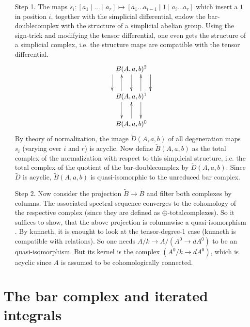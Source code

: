 \begin{itemize}
\item[Step 1.] The maps $s_i : [a_1 \mid \ldots \mid a_r] \mapsto [ a_1 \ldots a_{i-1} \mid 1 \mid a_i \ldots a_r]$ which insert a $1$ in position $i$, together with the simplicial differential, endow the bar-doublecomplex with the structure of a simplicial abelian group. Using the sign-trick and modifying the tensor differential, one even gets the structure of a simplicial complex, i.e. the structure maps are compatible with the tensor differential. 
\[
\xymatrix{
B(A, a, b)^2 \ar@<1cm>[d] \ar@<0cm>[d] \ar@<-1cm>[d] \\
B(A, a, b)^1 \ar@<0.5cm>[u] \ar@<-0.5cm>[u] \ar@<0.5cm>[d] \ar@<-0.5cm>[d] \\
B(A, a, b)^0 \ar[u]
}
\]
By theory of normalization, the image $\widetilde{D}(A, a, b)$ of all degeneration maps $s_i$ (varying over $i$ and $r$) is acyclic. Now define $\widetilde B(A,a,b)$ as the total complex of the normalization with respect to this simplicial structure, i.e. the total complex of the quotient of the bar-doublecomplex by $\widetilde D(A,a,b)$. 
Since $\widetilde D$ is acyclic, $\widetilde B(A,a,b)$ is quasi-isomorphic to the unreduced bar complex. 

\item[Step 2.] Now consider the projection $\widetilde B \to \overline B$ and filter both complexes by columns. The associated spectral sequence converges to the cohomology of the respective complex (since they are defined as $\oplus$-totalcomplexes). So it suffices to show, that the above projection is columnwise a quasi-isomorphism . By kunneth, it is enought to look at the tensor-degree-1 case (kunneth is compatible with relations). So one needs $A / k \to A / (A^0 \to dA^0)$ to be an quasi-isomorphism. But its kernel is the complex $(A^0/k \to dA^0)$, which is acyclic since $A$ is assumed to be cohomologically connected. 
\end{itemize}

\section{The bar complex and iterated integrals}

